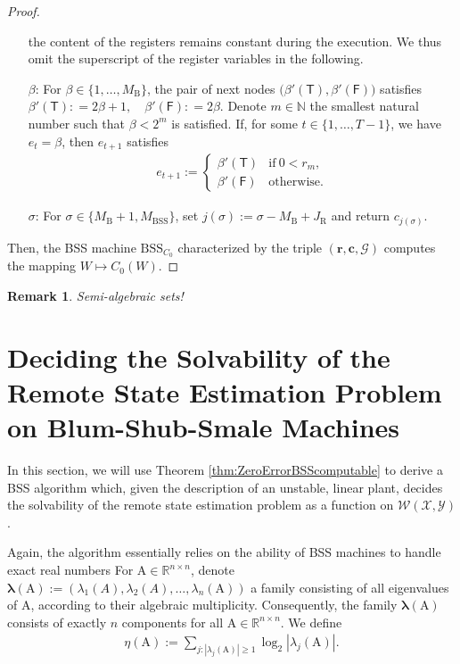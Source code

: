 \documentclass[conference]{IEEEtran}
\def\X{{\mathcal X}}
\def\Y{{\mathcal Y}}
\def\G{{\mathcal G}}
\def\W{{\mathcal W}}
\def\NN{{\mathbb N}}
\def\RR{{\mathbb R}}
\def\mA{\bm{\mathrm{A}}}
\newcommand{\BSS}{\mathrm{BSS}}
\newtheorem{Remark}[Theorem]{Remark}
\begin{document}
\begin{proof}
\begin{enumerate}
											the content of the registers remains constant during the execution. We thus omit the superscript of the
											register variables in the following.
										\item[\(\beta\)\hspace{1pt}:] 
											For \(\beta \in \{1,\ldots, M_\mathrm{B}\}\), the pair of next nodes \(\big(\beta'(\mathsf{T}),\beta'(\mathsf{F})\big)\) satisfies
											\(	\beta'(\mathsf{T}) :    =  2\beta + 1, \quad
												\beta'(\mathsf{F}) :    =  2\beta.
											\)
											Denote \(m\in\NN\) the smallest natural number such that \(\beta < 2^m\) is satisfied. If, for some \(t\in\{1,\ldots, T-1\}\), we have
											\(e_t = \beta\), then \(e_{t+1}\) satisfies
											\begin{align*}   e_{t+1} := \begin{cases}	\beta'(\mathsf{T}) &\text{if}~ 0 < r_m,\\
																						\beta'(\mathsf{F}) &\text{otherwise}.
																		\end{cases}
											\end{align*}
										\item[\(\sigma\)\hspace{1pt}:] For \(\sigma \in \{M_\mathrm{B} +1, M_\BSS\}\), set \(j(\sigma) := \sigma - M_\mathrm{B} + J_\mathrm{R}\) 
											and return \(c_{j(\sigma)}\).
					\end{enumerate}
					Then, the BSS machine \(\BSS_{C_0}\) characterized by the triple \((\bm{r}, \bm{c}, \G)\) computes the mapping \(W\mapsto C_0(W)\).
	\end{proof}
	
	\begin{Remark}
		Semi-algebraic sets!
	\end{Remark}

\section{Deciding the Solvability of the Remote State Estimation Problem on Blum-Shub-Smale Machines}	\label{sec:DecidingRemoteStateEstimationOnBSS}
	In this section, we will use Theorem \ref{thm:ZeroErrorBSScomputable} to derive a BSS algorithm which, given the description of an unstable, linear plant,
	decides the solvability of the remote state estimation problem as a function on \(\W(\X,\Y)\).
	
	Again, the algorithm essentially relies on the ability of BSS machines to handle exact real numbers 
	For \(\mA \in \RR^{n\times n}\), denote \(\bm{\lambda}(\mA) := (\lambda_1(A),\lambda_2(A),\ldots,\lambda_n(\mA))\) a family 
	consisting of all eigenvalues of \(\mA\), according to their algebraic multiplicity. Consequently, the family \(\bm{\lambda}(\mA)\)
	consists of exactly \(n\) components for all \(\mA\in \RR^{n\times n}\). We define
	\begin{align}	\eta(\mA):={\sum}_{j:|\lambda_j(\mA)|\geq 1} \log_2|\lambda_j(\mA)|.
	\end{align}
	
\end{document}
